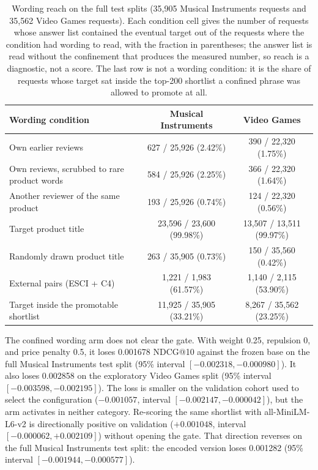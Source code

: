 \documentclass[11pt]{article}
\begin{document}
\begin{table}[ht]
\centering
\caption{Wording reach on the full test splits (35,905 Musical Instruments requests and 35,562 Video Games requests). Each condition cell gives the number of requests whose answer list contained the eventual target out of the requests where the condition had wording to read, with the fraction in parentheses; the answer list is read without the confinement that produces the measured number, so reach is a diagnostic, not a score. The last row is not a wording condition: it is the share of requests whose target sat inside the top-200 shortlist a confined phrase was allowed to promote at all.}
\label{tab:reach}
\small
\begin{tabular}{@{}lcc@{}}
\toprule
Wording condition & Musical Instruments & Video Games \\
\midrule
Own earlier reviews & 627 / 25,926 (2.42\%) & 390 / 22,320 (1.75\%) \\
Own reviews, scrubbed to rare product words & 584 / 25,926 (2.25\%) & 366 / 22,320 (1.64\%) \\
Another reviewer of the same product & 193 / 25,926 (0.74\%) & 124 / 22,320 (0.56\%) \\
Target product title & 23,596 / 23,600 (99.98\%) & 13,507 / 13,511 (99.97\%) \\
Randomly drawn product title & 263 / 35,905 (0.73\%) & 150 / 35,560 (0.42\%) \\
External pairs (ESCI + C4) & 1,221 / 1,983 (61.57\%) & 1,140 / 2,115 (53.90\%) \\
\midrule
Target inside the promotable shortlist & 11,925 / 35,905 (33.21\%) & 8,267 / 35,562 (23.25\%) \\
\bottomrule
\end{tabular}
\end{table}

The confined wording arm does not clear the gate. With weight 0.25, repulsion 0, and price penalty 0.5, it loses 0.001678 NDCG@10 against the frozen base on the full Musical Instruments test split (95\% interval $[-0.002318, -0.000980]$). It also loses 0.002858 on the exploratory Video Games split (95\% interval $[-0.003598, -0.002195]$). The loss is smaller on the validation cohort used to select the configuration ($-0.001057$, interval $[-0.002147, -0.000042]$), but the arm activates in neither category. Re-scoring the same shortlist with all-MiniLM-L6-v2 is directionally positive on validation ($+0.001048$, interval $[-0.000062, +0.002109]$) without opening the gate. That direction reverses on the full Musical Instruments test split: the encoded version loses 0.001282 (95\% interval $[-0.001944, -0.000577]$).
\end{document}
